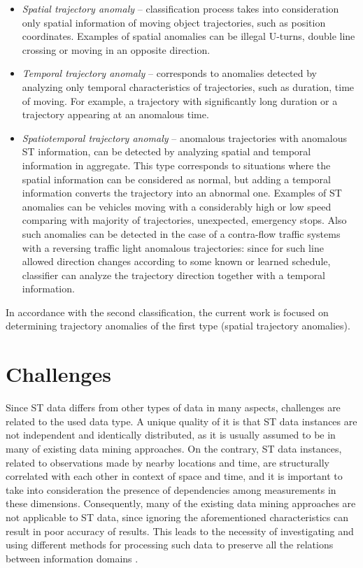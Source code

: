 \begin{itemize}
	\setlength\itemsep{0em}
	\item \textit{Spatial trajectory anomaly} -- classification process takes into consideration only spatial information of moving object trajectories, such as position coordinates. Examples of spatial anomalies can be illegal U-turns, double line crossing or moving in an opposite direction.
	\item \textit{Temporal trajectory anomaly} -- corresponds to anomalies detected by analyzing only temporal characteristics of trajectories, such as duration, time of moving. For example, a trajectory with significantly long duration or a trajectory appearing at an anomalous time.
	\item \textit{Spatiotemporal trajectory anomaly} -- anomalous trajectories with anomalous ST information, can be detected by analyzing spatial and temporal information in aggregate. This type corresponds to situations where the spatial information can be considered as normal, but adding a temporal information converts the trajectory into an abnormal one. Examples of ST anomalies can be vehicles moving with a considerably high or low speed comparing with majority of trajectories, unexpected, emergency stops. Also such anomalies can be detected in the case of a contra-flow traffic systems with a reversing traffic light anomalous trajectories: since for such line allowed direction changes according to some known or learned schedule, classifier can analyze the trajectory direction together with a temporal information.
\end{itemize}

In accordance with the second classification, the current work is focused on determining trajectory anomalies of the first type (spatial trajectory anomalies).

\section{Challenges}

Since ST data differs from other types of data in many aspects, challenges are related to the used data type. A unique quality of it is that ST data instances are not independent and identically distributed, as it is usually assumed to be in many of existing data mining approaches. On the contrary, ST data instances, related to observations made by nearby locations and time, are structurally correlated with each other in context of space and time, and it is important to take into consideration the presence of dependencies among measurements in these dimensions. Consequently, many of the existing data mining approaches are not applicable to ST data, since ignoring the aforementioned characteristics can result in poor accuracy of results. This leads to the necessity of investigating and using different methods for processing such data to preserve all the relations between information domains \cite{article:1_survey_stdm}.

